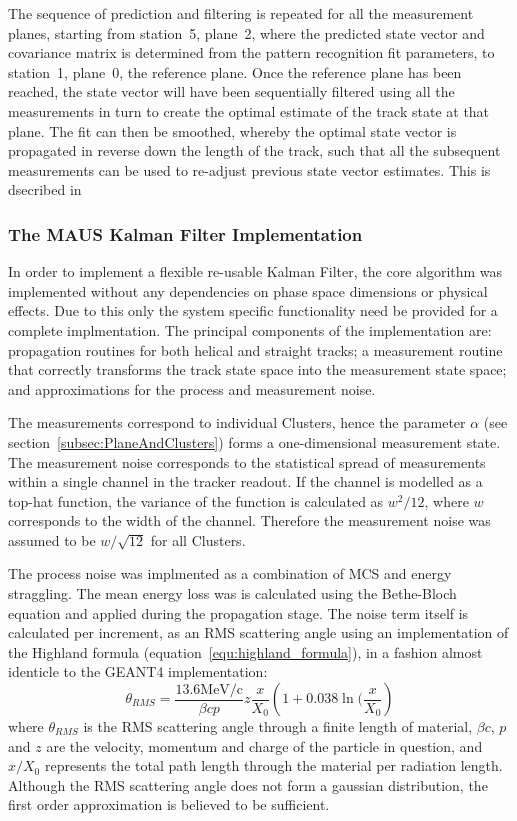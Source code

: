     The sequence of prediction and filtering is repeated for all the measurement planes, starting from station~5, plane~2, where the predicted state vector and covariance matrix is determined from the pattern recognition fit parameters, to station~1, plane~0, the reference plane. Once the reference plane has been reached, the state vector will have been sequentially filtered using all the measurements in turn to create the optimal estimate of the track state at that plane. The fit can then be smoothed, whereby the optimal state vector is propagated in reverse down the length of the track, such that all the subsequent measurements can be used to re-adjust previous state vector estimates. This is dsecribed in~\cite{Fruhwirth}


    \subsubsection{The MAUS Kalman Filter Implementation}
    In order to implement a flexible re-usable Kalman Filter, the core algorithm was implemented without any dependencies on phase space dimensions or physical effects. Due to this only the system specific functionality need be provided for a complete implmentation.
    The principal components of the implementation are: propagation routines for both helical and straight tracks; a measurement routine that correctly transforms the track state space into the measurement state space; and approximations for the process and measurement noise.
    
    The measurements correspond to individual Clusters, hence the parameter $\alpha$ (see section~\ref{subsec:PlaneAndClusters}) forms a one-dimensional measurement state. The measurement noise corresponds to the statistical spread of measurements within a single channel in the tracker readout. If the channel is modelled as a top-hat function, the variance of the function is calculated as $w^2/12$, where $w$ corresponds to the width of the channel. Therefore the measurement noise was assumed to be $w/\sqrt{12}$ for all Clusters.

    The process noise was implmented as a combination of MCS and energy straggling. The mean energy loss was is calculated using the Bethe-Bloch equation and applied during the propagation stage. The noise term itself is calculated per increment, as an RMS scattering angle using an implementation of the Highland formula (equation~\ref{equ:highland_formula}), in a fashion almost identicle to the GEANT4 implementation:
    \begin{equation}
      \theta_{RMS} = \frac{13.6\textrm{MeV/c}}{\beta c p} z \frac{x}{X_0}\left( 1 + 0.038 \ln(\frac{x}{X_0} \right)
      \label{equ:highland_formula}
    \end{equation}
    where $\theta_{RMS}$ is the RMS scattering angle through a finite length of material, $\beta c$, $p$ and $z$ are the velocity, momentum and charge of the particle in question, and $x/X_0$ represents the total path length through the material per radiation length. Although the RMS scattering angle does not form a gaussian distribution, the first order approximation is believed to be sufficient.

